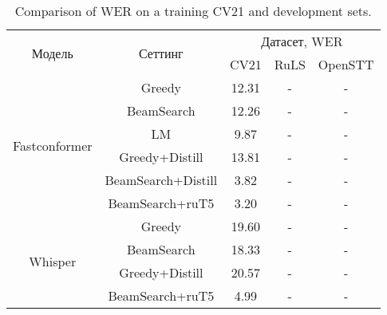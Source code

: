 \begin{table}[]
\centering
\caption{Comparison of WER on a training CV21 and development sets.}
\begin{tabular}{|c|c|ccc|}
\hline
\multirow{2}{*}{Модель}        & \multirow{2}{*}{Сеттинг}             & \multicolumn{3}{c|}{Датасет, WER}                                \\ \cline{3-5} 
                               &                                      & \multicolumn{1}{c|}{CV21}  & \multicolumn{1}{c|}{RuLS} & OpenSTT \\ \hline
\multirow{6}{*}{Fastconformer} & Greedy                               & \multicolumn{1}{c|}{12.31} & \multicolumn{1}{c|}{-}    & -       \\ \cline{2-5} 
                               & BeamSearch                           & \multicolumn{1}{c|}{12.26} & \multicolumn{1}{c|}{-}    & -       \\ \cline{2-5} 
                               & LM                                   & \multicolumn{1}{c|}{9.87}  & \multicolumn{1}{c|}{-}    & -       \\ \cline{2-5} 
                               & Greedy+Distill                       & \multicolumn{1}{c|}{13.81} & \multicolumn{1}{c|}{-}    & -       \\ \cline{2-5} 
                               & BeamSearch+Distill                   & \multicolumn{1}{c|}{3.82}  & \multicolumn{1}{c|}{-}    & -       \\ \cline{2-5} 
                               & BeamSearch+ruT5                      & \multicolumn{1}{c|}{3.20}  & \multicolumn{1}{c|}{-}    & -       \\ \hline
\multirow{4}{*}{Whisper}       & Greedy                               & \multicolumn{1}{c|}{19.60} & \multicolumn{1}{c|}{-}    & -       \\ \cline{2-5} 
                               & BeamSearch                           & \multicolumn{1}{c|}{18.33} & \multicolumn{1}{c|}{-}    & -       \\ \cline{2-5} 
                               & Greedy+Distill                       & \multicolumn{1}{c|}{20.57} & \multicolumn{1}{c|}{-}    & -       \\ \cline{2-5} 
                               & BeamSearch+ruT5                      & \multicolumn{1}{c|}{4.99}  & \multicolumn{1}{c|}{-}    & -       \\ \hline
\end{tabular}
\label{tab:res_cv_trained}
\end{table}

